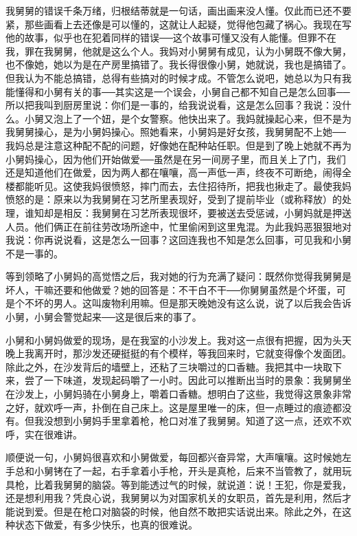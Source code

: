 我舅舅的错误千条万绪，归根结蒂就是一句话，画出画来没人懂。仅此而已还不要紧，那些画看上去还像是可以懂的，这就让人起疑，觉得他包藏了祸心。我现在写他的故事，似乎也在犯着同样的错误──这个故事可懂又没有人能懂。但罪不在我，罪在我舅舅，他就是这么个人。我妈对小舅舅有成见，认为小舅既不像大舅，也不像她，她以为是在产房里搞错了。我长得很像小舅，她就说，我也是搞错了。但我认为不能总搞错，总得有些搞对的时候才成。不管怎么说吧，她总以为只有我能懂得和小舅有关的事──其实这是一个误会，小舅自己都不知自己是怎么回事──所以把我叫到厨房里说：你们是一事的，给我说说看，这是怎么回事？我说：没什么。小舅又泡上了一个妞，是个女警察。他快出来了。我妈就操起心来，但不是为我舅舅操心，是为小舅妈操心。照她看来，小舅妈是好女孩，我舅舅配不上她──我妈总是注意这种配不配的问题，好像她在配种站任职。但是到了晚上她就不再为小舅妈操心，因为他们开始做爱──虽然是在另一间房子里，而且关上了门，我们还是知道他们在做爱，因为两人都在嚷嚷，高一声低一声，终夜不可断绝，闹得全楼都能听见。这使我妈很愤怒，摔门而去，去住招待所，把我也揪走了。最使我妈愤怒的是：原来以为我舅舅在习艺所里表现好，受到了提前毕业（或称释放）的处理，谁知却是相反：我舅舅在习艺所表现很坏，要被送去受惩诫，小舅妈就是押送人员。他们俩正在前往劳改场所途中，忙里偷闲到这里鬼混。为此我妈恶狠狠地对我说：你再说说看，这是怎么一回事？这回连我也不知是怎么回事，可见我和小舅不是一事的。 

等到领略了小舅妈的高觉悟之后，我对她的行为充满了疑问：既然你觉得我舅舅是坏人，干嘛还要和他做爱？她的回答是：不干白不干──你舅舅虽然是个坏蛋，可是个不坏的男人。这叫废物利用嘛。但是那天晚她没有这么说，说了以后我会告诉小舅，小舅会警觉起来──这是很后来的事了。 

小舅和小舅妈做爱的现场，是在我室的小沙发上。我对这一点很有把握，因为头天晚上我离开时，那沙发还硬挺挺的有个模样，等我回来时，它就变得像个发面团。除此之外，在沙发背后的墙壁上，还粘了三块嚼过的口香糖。我把其中一块取下来，尝了一下味道，发现起码嚼了一小时。因此可以推断出当时的景象：我舅舅坐在沙发上，小舅妈骑在小舅身上，嚼着口香糖。想明白了这些，我觉得这景象非常之好，就欢呼一声，扑倒在自己床上。这是屋里唯一的床，但一点睡过的痕迹都没有。但我没想到小舅妈手里拿着枪，枪口对准了我舅舅。知道了这一点，还欢不欢呼，实在很难讲。 

顺便说一句，小舅妈很喜欢和小舅做爱，每回都兴奋异常，大声嚷嚷。这时候她左手总和小舅铐在了一起，右手拿着小手枪，开头是真枪，后来不当管教了，就用玩具枪，比着我舅舅的脑袋。等到能透过气的时候，就说道：说！王犯，你是爱我，还是想利用我？凭良心说，我舅舅以为对国家机关的女职员，首先是利用，然后才能说到爱。但是在枪口对脑袋的时候，他自然不敢把实话说出来。除此之外，在这种状态下做爱，有多少快乐，也真的很难说。 

